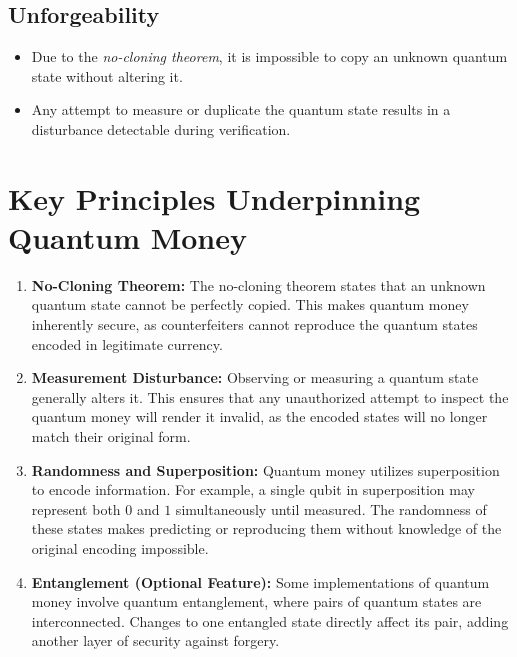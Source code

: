 \documentclass[11pt]{article}
\theoremstyle{definition}
\begin{document}
\subsection*{Unforgeability}
\begin{itemize}
    \item Due to the \textit{no-cloning theorem}, it is impossible to copy an unknown quantum state without altering it.
    \item Any attempt to measure or duplicate the quantum state results in a disturbance detectable during verification.
\end{itemize}

\section*{Key Principles Underpinning Quantum Money}
\begin{enumerate}
    \item \textbf{No-Cloning Theorem:} The no-cloning theorem states that an unknown quantum state cannot be perfectly copied. This makes quantum money inherently secure, as counterfeiters cannot reproduce the quantum states encoded in legitimate currency.
    \item \textbf{Measurement Disturbance:} Observing or measuring a quantum state generally alters it. This ensures that any unauthorized attempt to inspect the quantum money will render it invalid, as the encoded states will no longer match their original form.
    \item \textbf{Randomness and Superposition:} Quantum money utilizes superposition to encode information. For example, a single qubit in superposition may represent both $0$ and $1$ simultaneously until measured. The randomness of these states makes predicting or reproducing them without knowledge of the original encoding impossible.
    \item \textbf{Entanglement (Optional Feature):} Some implementations of quantum money involve quantum entanglement, where pairs of quantum states are interconnected. Changes to one entangled state directly affect its pair, adding another layer of security against forgery.
\end{enumerate}
\end{document}
